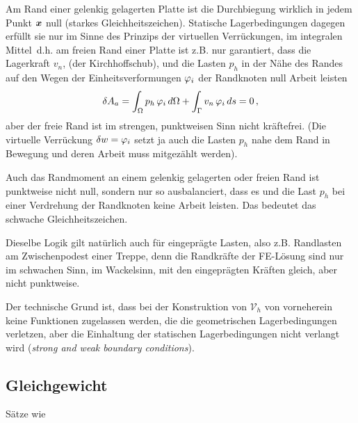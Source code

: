 Am Rand einer gelenkig gelagerten Platte ist die Durchbiegung wirklich in jedem Punkt $\mbox{\boldmath $x$}$  null (starkes Gleichheitszeichen). Statische Lagerbedingungen dagegen erf\"{u}llt sie nur im Sinne des Prinzips der virtuellen Verr\"{u}ckungen, \glq im integralen Mittel\grq\, d.h. am freien Rand einer Platte ist z.B. nur garantiert, dass die Lagerkraft $v_n$, (der Kirchhoffschub), und die Lasten $p_h$ in der N\"{a}he des Randes auf den Wegen der Einheitsverformungen $\varphi_i$ der Randknoten null Arbeit leisten
\begin{align}
\delta A_a = \int_{\Omega} p_h\,\varphi_i \,d\Omega + \int_{\Gamma} v_n\,\varphi_i\,ds = 0\,,
\end{align}
aber der freie Rand ist im strengen, punktweisen Sinn nicht kr\"{a}ftefrei. (Die virtuelle Verr\"{u}ckung $\delta w = \varphi_i$ setzt ja auch die Lasten $p_h$ nahe dem Rand in Bewegung und  deren Arbeit muss mitgez\"{a}hlt werden).

Auch das Randmoment an einem gelenkig gelagerten oder freien Rand ist punktweise nicht null, sondern nur so ausbalanciert, dass es und die Last $p_h$ bei einer Verdrehung der Randknoten  keine Arbeit leisten. Das bedeutet das schwache Gleichheitszeichen.

Dieselbe Logik gilt nat\"{u}rlich auch f\"{u}r eingepr\"{a}gte Lasten, also z.B. Randlasten am Zwischenpodest einer Treppe, denn die Randkr\"{a}fte der FE-L\"{o}sung sind nur im schwachen Sinn, im Wackelsinn, mit den eingepr\"{a}gten Kr\"{a}ften gleich, aber nicht punktweise.

Der technische Grund ist, dass bei der Konstruktion von $\mathcal{V}_h$ von vorneherein keine Funktionen zugelassen werden, die die geometrischen Lagerbedingungen verletzen, aber die Einhaltung der statischen Lagerbedingungen nicht verlangt wird ({\em strong and weak boundary conditions\/}).

{\textcolor{sectionTitleBlue}{\section{Gleichgewicht}}}\label{Gleichgewicht}
S\"{a}tze wie\\


